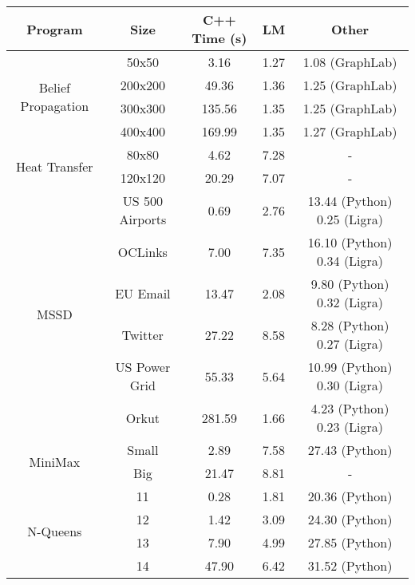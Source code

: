 \begin{tabular}{c | c || c | c | c} \hline
	\textbf{Program} & \textbf{Size} & \textbf{C++ Time} (s) & \textbf{LM} & \textbf{Other} \\ \hline \hline
	\multirow{4}{*}{Belief Propagation}  & 50x50 &  3.16  &  1.27  &  1.08 (GraphLab) \\
		 & 200x200 &  49.36  &  1.36  &  1.25 (GraphLab) \\
		 & 300x300 &  135.56  &  1.35  &  1.25 (GraphLab) \\
		 & 400x400 &  169.99  &  1.35  &  1.27 (GraphLab) \\
	\hline
	\multirow{2}{*}{Heat Transfer}  & 80x80 &  4.62  &  7.28  &  - \\
		 & 120x120 &  20.29  &  7.07  &  - \\
	\hline
	\multirow{6}{*}{MSSD}  & US 500 Airports &  0.69  &  2.76  &  13.44 (Python) 0.25 (Ligra) \\
		 & OCLinks &  7.00  &  7.35  &  16.10 (Python) 0.34 (Ligra) \\
		 & EU Email &  13.47  &  2.08  &  9.80 (Python) 0.32 (Ligra) \\
		 & Twitter &  27.22  &  8.58  &  8.28 (Python) 0.27 (Ligra) \\
		 & US Power Grid &  55.33  &  5.64  &  10.99 (Python) 0.30 (Ligra) \\
		 & Orkut &  281.59  &  1.66  &  4.23 (Python) 0.23 (Ligra) \\
	\hline
	\multirow{2}{*}{MiniMax}  & Small &  2.89  &  7.58  &  27.43 (Python) \\
		 & Big &  21.47  &  8.81  &  - \\
	\hline
	\multirow{4}{*}{N-Queens}  & 11 &  0.28  &  1.81  &  20.36 (Python) \\
		 & 12 &  1.42  &  3.09  &  24.30 (Python) \\
		 & 13 &  7.90  &  4.99  &  27.85 (Python) \\
		 & 14 &  47.90  &  6.42  &  31.52 (Python) \\
	\hline
\end{tabular}

